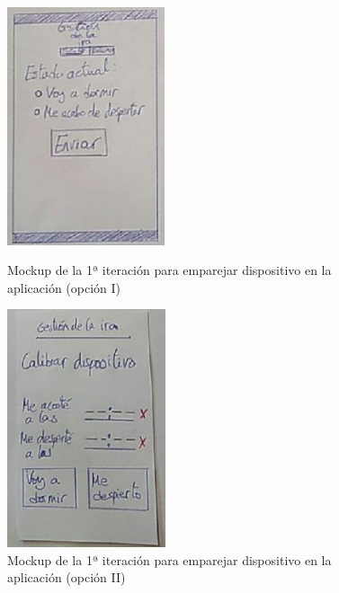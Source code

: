 \begin{itemize}
    \begin{figure}[H]
        \centering
        \begin{minipage}{.45\textwidth}
            \centering
            \includegraphics[width=0.8\linewidth, height=7cm]{Imagenes/04DescProblema/mockups/v1/android/03-calibrar.png}
            \caption[Mockup de la 1ª iteración para emparejar dispositivo en la aplicación (opción I)]{Mockup de la 1ª iteración para emparejar dispositivo en la aplicación (opción I)}
            \label{c4:fig:v1:android:calibrar}
        \end{minipage}
        \hfill\vline\hfill
        \begin{minipage}{.45\textwidth}
            \centering
            \includegraphics[width=0.8\linewidth, height=7cm]{Imagenes/04DescProblema/mockups/v1/android/03-calibrar-2.png}
            \caption[Mockup de la 1ª iteración para emparejar dispositivo en la aplicación (opción II)]{Mockup de la 1ª iteración para emparejar dispositivo en la aplicación (opción II)}
            \label{c4:fig:v1:android:calibrar2}
        \end{minipage}
    \end{figure}


\end{itemize}
